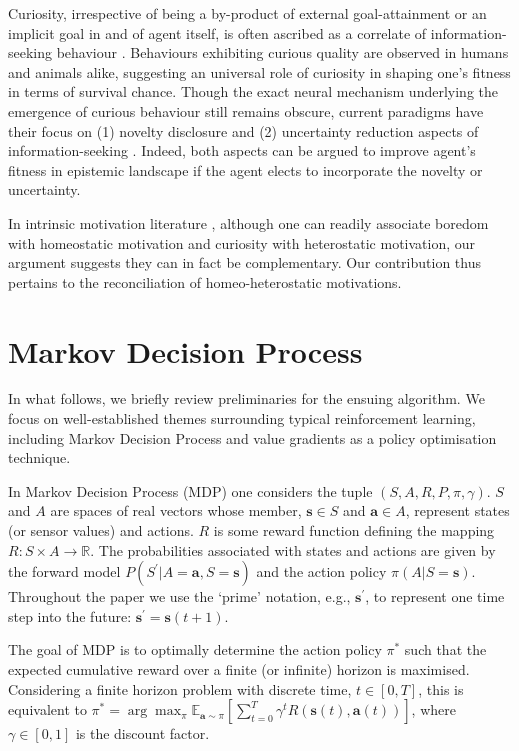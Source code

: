 \documentclass[utf8]{frontiersSCNS}
\newcommand{\bs}{\boldsymbol}
\newcommand{\argmax}{\arg\max}
\begin{document}
Curiosity, irrespective of being a by-product of external goal-attainment or an implicit goal in and of agent itself, is often ascribed as a correlate of information-seeking behaviour \citep{2013gottlieb}. Behaviours exhibiting curious quality are observed in humans and animals alike, suggesting an universal role of curiosity in shaping one's fitness in terms of survival chance. Though the exact neural mechanism underlying the emergence of curious behaviour still remains obscure, current paradigms have their focus on (1) novelty disclosure and (2) uncertainty reduction aspects of information-seeking \citep{pathak2017icm, friston2017curiosity, bellemare2016count, ostrovski2017count}. Indeed, both aspects can be argued to improve agent's fitness in epistemic landscape if the agent elects to incorporate the novelty or uncertainty.

In intrinsic motivation literature \citep{intrinsicmotiv}, although one can readily associate boredom with homeostatic motivation and curiosity with heterostatic motivation, our argument suggests they can in fact be complementary. Our contribution thus pertains to the reconciliation of homeo-heterostatic motivations.

\section{Markov Decision Process}

In what follows, we briefly review preliminaries for the ensuing algorithm. We focus on well-established themes surrounding typical reinforcement learning, including Markov Decision Process and value gradients as a policy optimisation technique. 

In Markov Decision Process (MDP) one considers the tuple $(S, A, R, P, \pi, \gamma)$. $S$ and $A$ are spaces of real vectors whose member, $\bs{s} \in S$ and $\bs{a} \in A$, represent states (or sensor values) and actions. $R$ is some reward function defining the mapping $R: S \times A \to \mathbb{R}$. The probabilities associated with states and actions are given by the forward model $P (S^\prime|A=\bs{a}, S=\bs{s})$ and the action policy $\pi(A|S=\bs{s})$. Throughout the paper we use the `prime' notation, e.g., $\bs{s}^\prime$, to represent one time step into the future: $\bs{s}^\prime=\bs{s}(t+1)$.

The goal of MDP is to optimally determine the action policy $\pi^\ast$ such that the expected cumulative reward over a finite (or infinite) horizon is maximised. Considering a finite horizon problem with discrete time, $t \in [0, T]$, this is equivalent to $\pi^\ast = \argmax_\pi \mathbb E_{\bs{a} \sim \pi}\left[ \sum_{t=0}^{T}\gamma^t R(\bs{s}(t), \bs{a}(t)) \right]$, where $\gamma \in [0, 1]$ is the discount factor.
\end{document}

